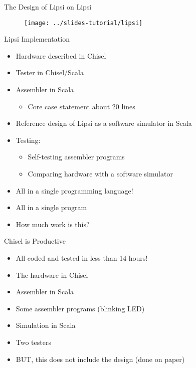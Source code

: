 \begin{frame}[fragile]{The Design of Lipsi on Lipsi}
\begin{figure}
    \centering
    \texttt{[image: ../slides-tutorial/lipsi]}
\end{figure}
\end{frame}

\begin{frame}[fragile]{Lipsi Implementation}
\begin{itemize}
\item Hardware described in Chisel
\item Tester in Chisel/Scala
\item Assembler in Scala
\begin{itemize}
\item Core case statement about 20 lines
\end{itemize}
\item Reference design of Lipsi as a software simulator in Scala
\item Testing:
\begin{itemize}
\item Self-testing assembler programs
\item Comparing hardware with a software simulator
\end{itemize}
\item All in a single programming language!
\item All in a single program
\item How much work is this?
\end{itemize}
\end{frame}

\begin{frame}[fragile]{Chisel is Productive}
\begin{itemize}
\item All coded and tested in less than 14 hours!
\end{itemize}
\begin{itemize}
\item The hardware in Chisel
\item Assembler in Scala
\item Some assembler programs (blinking LED)
\item Simulation in Scala
\item Two testers
\end{itemize}
\begin{itemize}
\item BUT, this does not include the design (done on paper)
\end{itemize}
\end{frame}

